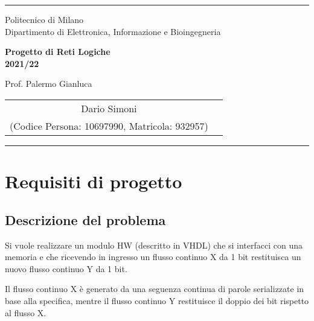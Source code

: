\documentclass{article}
\begin{document}
\setlength\parindent{0pt} %
\setlength\parskip{1em}

\begin{titlepage}
    \centering
    \hrule

    \vspace{0,5cm}
    {
        \normalsize Politecnico di Milano\\
        Dipartimento di Elettronica, Informazione e Bioingegneria
    }

    \vspace{5cm}
    {\Huge \textbf{Progetto di Reti Logiche\\
            2021/22}\\}

    \vspace{0,5cm}
    \large {Prof. Palermo Gianluca}

    \vspace{5cm}
    {
        \large
        \begin{tabular}{c c}
            Dario Simoni \\
            (Codice Persona: 10697990, Matricola: 932957) \\
        \end{tabular}

    }

    \vspace{6.5cm}


    \hrule

\end{titlepage}

\pagebreak

\tableofcontents

\pagebreak

\section{Requisiti di progetto} %
\subsection{Descrizione del problema} %
Si vuole realizzare un modulo HW (descritto in VHDL) che si interfacci con una memoria e che
ricevendo in ingresso un flusso continuo X da 1 bit restituisca un nuovo flusso continuo Y da 1 bit.
\par
Il flusso continuo X è generato da una seguenza continua di parole serializzate in base alla specifica, mentre il flusso continuo Y restituisce il doppio dei bit rispetto al flusso X.
\vspace

\clearpage
\end{document}
